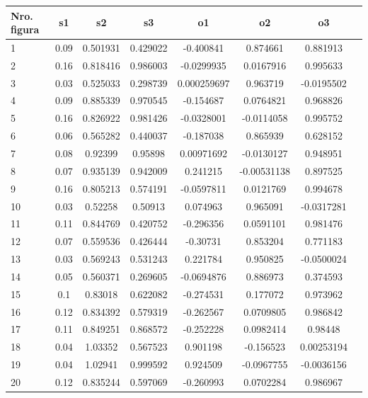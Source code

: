 \documentclass[pdftex,a4paper,12pt]{article}
\begin{document}
\begin{tabular}{|l|c|c|c|c|c|c|c|}


  \hline                       
  \textbf{Nro. figura} & \textbf{s1} & \textbf{s2} & \textbf{s3} & \textbf{o1} & \textbf{o2} & \textbf{o3}\\
  \hline
1 & 0.09 & 0.501931 & 0.429022 & -0.400841 & 0.874661 & 0.881913\\
\hline
2 & 0.16 & 0.818416 & 0.986003 & -0.0299935 & 0.0167916 & 0.995633\\
\hline
3 & 0.03 & 0.525033 & 0.298739 & 0.000259697 & 0.963719 & -0.0195502\\
\hline
4 & 0.09 & 0.885339 & 0.970545 & -0.154687 & 0.0764821 & 0.968826\\
\hline
5 & 0.16 & 0.826922 & 0.981426 & -0.0328001 & -0.0114058 & 0.995752\\
\hline
6 & 0.06 & 0.565282 & 0.440037 & -0.187038 & 0.865939 & 0.628152\\
\hline
7 & 0.08 & 0.92399 & 0.95898 & 0.00971692 & -0.0130127 & 0.948951\\
\hline
8 & 0.07 & 0.935139 & 0.942009 & 0.241215 & -0.00531138 & 0.897525\\
\hline
9 & 0.16 & 0.805213 & 0.574191 & -0.0597811 & 0.0121769 & 0.994678\\
\hline
10 & 0.03 & 0.52258 & 0.50913 & 0.074963 & 0.965091 & -0.0317281\\
\hline
11 & 0.11 & 0.844769 & 0.420752 & -0.296356 & 0.0591101 & 0.981476\\
\hline
12 & 0.07 & 0.559536 & 0.426444 & -0.30731 & 0.853204 & 0.771183\\
\hline
13 & 0.03 & 0.569243 & 0.531243 & 0.221784 & 0.950825 & -0.0500024\\
\hline
14 & 0.05 & 0.560371 & 0.269605 & -0.0694876 & 0.886973 & 0.374593\\
\hline
15 & 0.1 & 0.83018 & 0.622082 & -0.274531 & 0.177072 & 0.973962\\
\hline
16 & 0.12 & 0.834392 & 0.579319 & -0.262567 & 0.0709805 & 0.986842\\
\hline
17 & 0.11 & 0.849251 & 0.868572 & -0.252228 & 0.0982414 & 0.98448\\
\hline
18 & 0.04 & 1.03352 & 0.567523 & 0.901198 & -0.156523 & 0.00253194\\
\hline
19 & 0.04 & 1.02941 & 0.999592 & 0.924509 & -0.0967755 & -0.0036156\\
\hline
20 & 0.12 & 0.835244 & 0.597069 & -0.260993 & 0.0702284 & 0.986967\\

\end{tabular}
\end{document}

